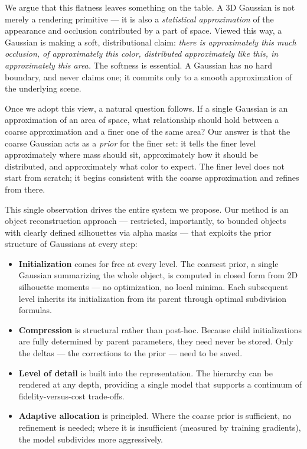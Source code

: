 \documentclass[acmtog]{acmart}
\begin{document}
We argue that this flatness leaves something on the table. A 3D Gaussian is not merely a rendering primitive --- it is also a \emph{statistical approximation} of the appearance and occlusion contributed by a part of space. Viewed this way, a Gaussian is making a soft, distributional claim: \emph{there is approximately this much occlusion, of approximately this color, distributed approximately like this, in approximately this area.} The softness is essential. A Gaussian has no hard boundary, and never claims one; it commits only to a smooth approximation of the underlying scene.

Once we adopt this view, a natural question follows. If a single Gaussian is an approximation of an area of space, what relationship should hold between a coarse approximation and a finer one of the same area? Our answer is that the coarse Gaussian acts as a \emph{prior} for the finer set: it tells the finer level approximately where mass should sit, approximately how it should be distributed, and approximately what color to expect. The finer level does not start from scratch; it begins consistent with the coarse approximation and refines from there.

This single observation drives the entire system we propose. Our method is an object reconstruction approach --- restricted, importantly, to bounded objects with clearly defined silhouettes via alpha masks --- that exploits the prior structure of Gaussians at every step:

\begin{itemize}
    \item \textbf{Initialization} comes for free at every level. The coarsest prior, a single Gaussian summarizing the whole object, is computed in closed form from 2D silhouette moments --- no optimization, no local minima. Each subsequent level inherits its initialization from its parent through optimal subdivision formulas.
    \item \textbf{Compression} is structural rather than post-hoc. Because child initializations are fully determined by parent parameters, they need never be stored. Only the deltas --- the corrections to the prior --- need to be saved.
    \item \textbf{Level of detail} is built into the representation. The hierarchy can be rendered at any depth, providing a single model that supports a continuum of fidelity-versus-cost trade-offs.
    \item \textbf{Adaptive allocation} is principled. Where the coarse prior is sufficient, no refinement is needed; where it is insufficient (measured by training gradients), the model subdivides more aggressively.
\end{itemize}
\end{document}
